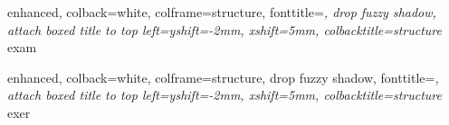 %
{
	enhanced,
	colback=white,
	colframe=structure,
	fonttitle=\itshape\rmfamily,
	drop fuzzy shadow,
	attach boxed title to top left={yshift=-2mm, xshift=5mm},
	colbacktitle=structure
	}{exam}%


%
{
	enhanced,
	colback=white,
	colframe=structure,
	drop fuzzy shadow,
	fonttitle=\itshape\rmfamily,
	attach boxed title to top left={yshift=-2mm, xshift=5mm},
	colbacktitle=structure
	}{exer}



\newcommand{\mini}[2][0.8]{
	\begin{minipage}[c]{#1\columnwidth}
		\raggedright
		#2
	\end{minipage}
}
\newcommand{\minit}[2][0.8]{
	\begin{minipage}[t]{#1\columnwidth}
		#2
	\end{minipage}
}

\newcommand{\cmini}[2][0.8]{
	\begin{center}
		\begin{minipage}{#1\columnwidth}
			\raggedright
			#2
		\end{minipage}
	\end{center}
}



\newcommand{\fig}[2][1]{%
	\texttt{[image: \#2]}
}

\newcommand{\cbox}[2][1]{%
	\setlength\fboxsep{5mm}
	\setlength\fboxrule{.2 mm}
	\begin{center}
		\fcolorbox{black}{white}{
			\vspace{-0.5cm}
			\begin{minipage}{#1\columnwidth}
				\raggedright
				#2
			\end{minipage}
		}
	\end{center}
	\setlength\fboxsep{0cm}
}

\newcommand{\cfig}[2][1]{%
	\begin{center}
		\texttt{[image: \#2]}
	\end{center}
}





